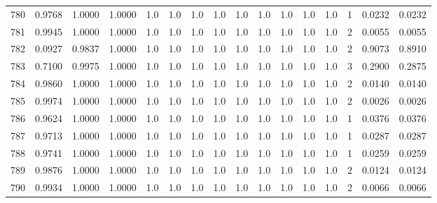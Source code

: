 \begin{tabular}{lrrrrrrrrrrrrrrr}
780 &      0.9768 &  1.0000 &  1.0000 &     1.0 &     1.0 &     1.0 &     1.0 &     1.0 &     1.0 &     1.0 &      1.0 &        1.0 &      1 &                    0.0232 &                     0.0232 \\
781 &      0.9945 &  1.0000 &  1.0000 &     1.0 &     1.0 &     1.0 &     1.0 &     1.0 &     1.0 &     1.0 &      1.0 &        1.0 &      2 &                    0.0055 &                     0.0055 \\
782 &      0.0927 &  0.9837 &  1.0000 &     1.0 &     1.0 &     1.0 &     1.0 &     1.0 &     1.0 &     1.0 &      1.0 &        1.0 &      2 &                    0.9073 &                     0.8910 \\
783 &      0.7100 &  0.9975 &  1.0000 &     1.0 &     1.0 &     1.0 &     1.0 &     1.0 &     1.0 &     1.0 &      1.0 &        1.0 &      3 &                    0.2900 &                     0.2875 \\
784 &      0.9860 &  1.0000 &  1.0000 &     1.0 &     1.0 &     1.0 &     1.0 &     1.0 &     1.0 &     1.0 &      1.0 &        1.0 &      2 &                    0.0140 &                     0.0140 \\
785 &      0.9974 &  1.0000 &  1.0000 &     1.0 &     1.0 &     1.0 &     1.0 &     1.0 &     1.0 &     1.0 &      1.0 &        1.0 &      2 &                    0.0026 &                     0.0026 \\
786 &      0.9624 &  1.0000 &  1.0000 &     1.0 &     1.0 &     1.0 &     1.0 &     1.0 &     1.0 &     1.0 &      1.0 &        1.0 &      1 &                    0.0376 &                     0.0376 \\
787 &      0.9713 &  1.0000 &  1.0000 &     1.0 &     1.0 &     1.0 &     1.0 &     1.0 &     1.0 &     1.0 &      1.0 &        1.0 &      1 &                    0.0287 &                     0.0287 \\
788 &      0.9741 &  1.0000 &  1.0000 &     1.0 &     1.0 &     1.0 &     1.0 &     1.0 &     1.0 &     1.0 &      1.0 &        1.0 &      1 &                    0.0259 &                     0.0259 \\
789 &      0.9876 &  1.0000 &  1.0000 &     1.0 &     1.0 &     1.0 &     1.0 &     1.0 &     1.0 &     1.0 &      1.0 &        1.0 &      2 &                    0.0124 &                     0.0124 \\
790 &      0.9934 &  1.0000 &  1.0000 &     1.0 &     1.0 &     1.0 &     1.0 &     1.0 &     1.0 &     1.0 &      1.0 &        1.0 &      2 &                    0.0066 &                     0.0066 \\

\end{tabular}
